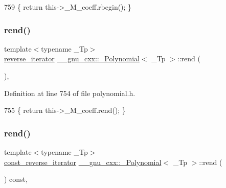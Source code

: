 \begin{DoxyCode}
759       \{ \textcolor{keywordflow}{return} this->\_M\_coeff.rbegin(); \}
\end{DoxyCode}
\mbox{\label{class____gnu__cxx_1_1__Polynomial_a8373c6b9a787a52798e4319906858d33}} 
\subsubsection{\texorpdfstring{rend()}{rend()}\hspace{0.1cm}{\footnotesize\ttfamily [1/2]}}
{\footnotesize\ttfamily template$<$typename \+\_\+\+Tp$>$ \\
\hyperlink{class____gnu__cxx_1_1__Polynomial_aed8f7d97c575d5c34c54170631953415}{reverse\+\_\+iterator} \hyperlink{class____gnu__cxx_1_1__Polynomial}{\+\_\+\+\_\+gnu\+\_\+cxx\+::\+\_\+\+Polynomial}$<$ \+\_\+\+Tp $>$\+::rend (\begin{DoxyParamCaption}{ }\end{DoxyParamCaption})\hspace{0.3cm}{\ttfamily [inline]}, {\ttfamily [noexcept]}}



Definition at line 754 of file polynomial.\+h.


\begin{DoxyCode}
755       \{ \textcolor{keywordflow}{return} this->\_M\_coeff.rend(); \}
\end{DoxyCode}
\mbox{\label{class____gnu__cxx_1_1__Polynomial_abeca4b1cffc4a52db34375b99b6d3d11}} 
\subsubsection{\texorpdfstring{rend()}{rend()}\hspace{0.1cm}{\footnotesize\ttfamily [2/2]}}
{\footnotesize\ttfamily template$<$typename \+\_\+\+Tp$>$ \\
\hyperlink{class____gnu__cxx_1_1__Polynomial_a2a042a80127ab9a7b0349a54791e59af}{const\+\_\+reverse\+\_\+iterator} \hyperlink{class____gnu__cxx_1_1__Polynomial}{\+\_\+\+\_\+gnu\+\_\+cxx\+::\+\_\+\+Polynomial}$<$ \+\_\+\+Tp $>$\+::rend (\begin{DoxyParamCaption}{ }\end{DoxyParamCaption}) const\hspace{0.3cm}{\ttfamily [inline]}, {\ttfamily [noexcept]}}



